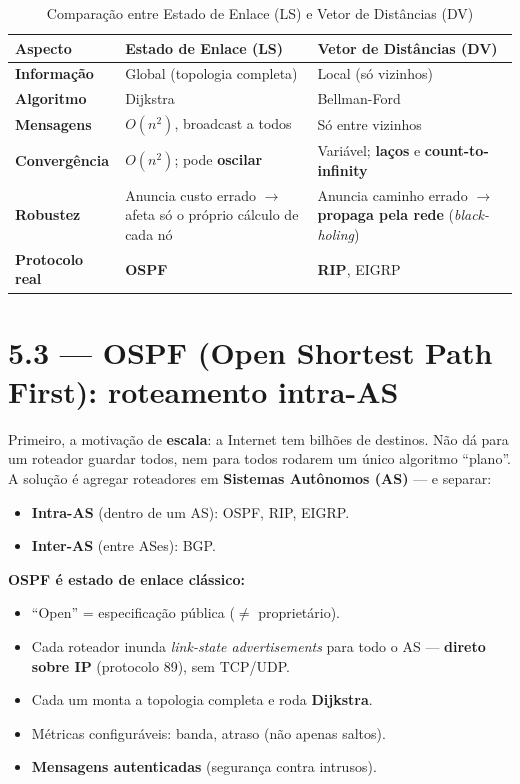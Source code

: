 \documentclass[11pt,a4paper]{article}
\begin{document}
\begin{table}[h!]
\centering
\caption{Comparação entre Estado de Enlace (LS) e Vetor de Distâncias (DV)}
\label{tab:ls_vs_dv}
\begin{tabularx}{\textwidth}{lXX}
\toprule
\textbf{Aspecto} & \textbf{Estado de Enlace (LS)} & \textbf{Vetor de Distâncias (DV)} \\
\midrule
\textbf{Informação} & Global (topologia completa) & Local (só vizinhos) \\
\textbf{Algoritmo} & Dijkstra & Bellman-Ford \\
\textbf{Mensagens} & $O(n^2)$, broadcast a todos & Só entre vizinhos \\
\textbf{Convergência} & $O(n^2)$; pode \textbf{oscilar} & Variável; \textbf{laços} e \textbf{count-to-infinity} \\
\textbf{Robustez} & Anuncia custo errado $\to$ afeta só o próprio cálculo de cada nó & Anuncia caminho errado $\to$ \textbf{propaga pela rede} (\emph{black-holing}) \\
\textbf{Protocolo real} & \textbf{OSPF} & \textbf{RIP}, EIGRP \\
\bottomrule
\end{tabularx}
\end{table}

\hrulefill

\section{5.3 --- OSPF (Open Shortest Path First): roteamento intra-AS}

Primeiro, a motivação de \textbf{escala}: a Internet tem bilhões de destinos. Não dá para um roteador guardar todos, nem para todos rodarem um único algoritmo ``plano''. A solução é agregar roteadores em \textbf{Sistemas Autônomos (AS)} --- e separar:
\begin{itemize}
    \item \textbf{Intra-AS} (dentro de um AS): OSPF, RIP, EIGRP.
    \item \textbf{Inter-AS} (entre ASes): BGP.
\end{itemize}

\textbf{OSPF é estado de enlace clássico:}
\begin{itemize}
    \item ``Open'' = especificação pública ($\neq$ proprietário).
    \item Cada roteador inunda \textit{link-state advertisements} para todo o AS --- \textbf{direto sobre IP} (protocolo 89), sem TCP/UDP.
    \item Cada um monta a topologia completa e roda \textbf{Dijkstra}.
    \item Métricas configuráveis: banda, atraso (não apenas saltos).
    \item \textbf{Mensagens autenticadas} (segurança contra intrusos).
\end{itemize}
\end{document}
